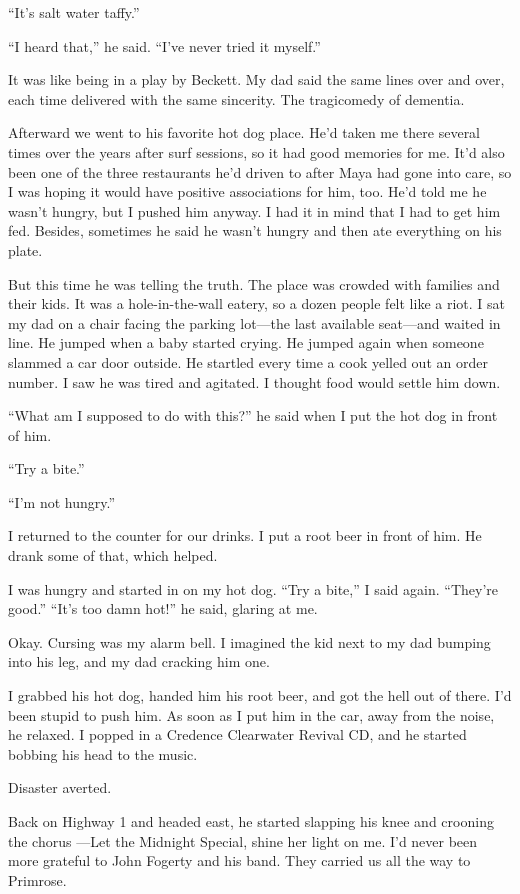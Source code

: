 \documentclass[12pt]{book}
\begin{document}
``It's salt water taffy.''

``I heard that,'' he said. ``I've never tried it myself.''

It was like being in a play by Beckett. My dad said the same lines over and over, each time delivered with the same sincerity. The tragicomedy of dementia.

Afterward we went to his favorite hot dog place. He'd taken me there several times over the years after surf sessions, so it had good memories for me. It'd also been one of the three restaurants he'd driven to after Maya had gone into care, so I was hoping it would have positive associations for him, too. He'd told me he wasn't hungry, but I pushed him anyway. I had it in mind that I had to get him fed. Besides, sometimes he said he wasn't hungry and then ate everything on his plate.

But this time he was telling the truth. The place was crowded with families and their kids. It was a hole-in-the-wall eatery, so a dozen people felt like a riot. I sat my dad on a chair facing the parking lot---the last available seat---and waited in line. He jumped when a baby started crying. He jumped again when someone slammed a car door outside. He startled every time a cook yelled out an order number. I saw he was tired and agitated. I thought food would settle him down.

``What am I supposed to do with this?'' he said when I put the hot dog in front of him.

``Try a bite.''

``I'm not hungry.''

I returned to the counter for our drinks. I put a root beer in front of him. He drank some of that, which helped.

I was hungry and started in on my hot dog. ``Try a bite,'' I said again. ``They're good.'' ``It's too damn hot!'' he said, glaring at me.

Okay. Cursing was my alarm bell. I imagined the kid next to my dad bumping into his leg, and my dad cracking him one.

I grabbed his hot dog, handed him his root beer, and got the hell out of there. I'd been stupid to push him. As soon as I put him in the car, away from the noise, he relaxed. I popped in a Credence Clearwater Revival CD, and he started bobbing his head to the music.

Disaster averted.

Back on Highway 1 and headed east, he started slapping his knee and crooning the chorus ---Let the Midnight Special, shine her light on me. I'd never been more grateful to John Fogerty and his band. They carried us all the way to Primrose.
\end{document}
